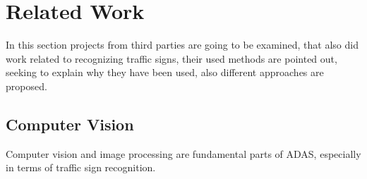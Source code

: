 
\chapter{Related Work}\label{chapter:Related Work}
In this section projects from third parties are going to be examined, that also did work related to recognizing traffic signs, their used methods are pointed out, seeking to explain why they have been used, also different approaches are proposed.

\section{Computer Vision}
Computer vision and image processing are fundamental parts of ADAS, especially in terms of traffic sign recognition.
